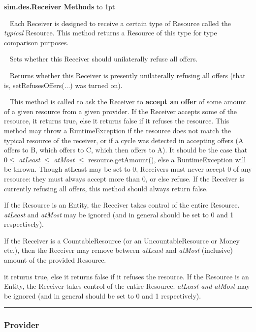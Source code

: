 \documentclass[twoside,10pt]{article}
\newcommand\class[1]{\index{Classes!{#1}}\textsf{#1}}
\newcommand*{\xfill}[1][0pt]{%
	\cleaders
		\hbox to 1pt{\hss
			\raisebox{#1}{\rule{1.2pt}{0.4pt}}%
			\hss}\hfill}
\newenvironment{methods}[1]{
\vspace{1.0em}\noindent\textsf{\textbf{#1 Methods}}\quad \xfill[0.5ex]
\vspace{-0.25em}
\begin{description}
\small}
{\end{description}\hrule\vspace{1.5em}}
\newcommand{\mthd}[1]{\item[{\sf #1}]~\newline}
\begin{document}
\begin{methods}{\class{sim.des.Receiver}}


\mthd{public boolean Resource getTypicalReceived()}
Each Receiver is designed to receive a certain type of Resource called the {\it typical} Resource.  This method returns a Resource of this type for type comparison purposes.

\mthd{public void setRefusesOffers(boolean value)}
Sets whether this Receiver should unilaterally refuse all offers.

\mthd{public boolean getRefusesOffers()}
Returns whether this Receiver is presently unilaterally refusing all offers (that is, setRefusesOffers(...) was turned on).

\mthd{public boolean accept(Provider provider, Resource resource, double atLeast, double atMost)}
This method is called to ask the Receiver to {\bf accept an offer} of some amount of a given resource from a given provider.   If the Receiver accepts some of the resource, it returns true, else it returns false if it refuses the resource.   This method may throw a RuntimeException if the resource does not match the typical resource of the receiver, or if a cycle was detected in accepting offers (A offers to B, which offers to C, which then offers to A).  It should be the case that \(0 \leq\) {\it atLeast} \(\leq\) {\it atMost} \(\leq\) resource.getAmount(), else a RuntimeException will be thrown.  Though atLeast may be set to 0, Receivers must never accept 0 of any resource: they must always accept more than 0, or else refuse.  If the Receiver is currently refusing all offers, this method should always return false.

If the Resource is an Entity, the Receiver takes control of the entire Resource.  {\it atLeast} and {\it atMost} may be ignored (and in general should be set to 0 and 1 respectively).

If the Receiver is a CountableResource (or an UncountableResource or Money etc.), then the Receiver may remove between {\it atLeast} and {\it atMost} (inclusive) amount of the provided Resource.

it returns true, else it returns false if it refuses the resource.   If the Resource is an Entity, the Receiver takes control of the entire Resource.  {\it atLeast and atMost} may be ignored (and in general should be set to 0 and 1 respectively).

\end{methods}

\subsubsection{Provider}
\end{document}
